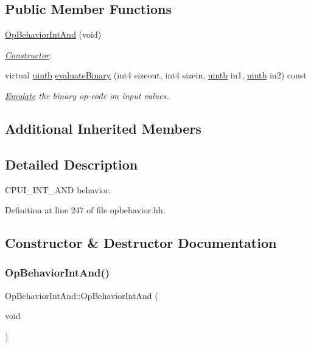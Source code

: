 \subsection*{Public Member Functions}
\begin{DoxyCompactItemize}
\item 
\mbox{\hyperlink{class_op_behavior_int_and_aa3c7566a1b2d06d7e1aba32a1c5fa094}{Op\+Behavior\+Int\+And}} (void)
\begin{DoxyCompactList}\small\item\em \mbox{\hyperlink{class_constructor}{Constructor}}. \end{DoxyCompactList}\item 
virtual \mbox{\hyperlink{types_8h_a2db313c5d32a12b01d26ac9b3bca178f}{uintb}} \mbox{\hyperlink{class_op_behavior_int_and_af41eb8b0c35f3d683e2692e532c116ff}{evaluate\+Binary}} (int4 sizeout, int4 sizein, \mbox{\hyperlink{types_8h_a2db313c5d32a12b01d26ac9b3bca178f}{uintb}} in1, \mbox{\hyperlink{types_8h_a2db313c5d32a12b01d26ac9b3bca178f}{uintb}} in2) const
\begin{DoxyCompactList}\small\item\em \mbox{\hyperlink{class_emulate}{Emulate}} the binary op-\/code on input values. \end{DoxyCompactList}\end{DoxyCompactItemize}
\subsection*{Additional Inherited Members}


\subsection{Detailed Description}
C\+P\+U\+I\+\_\+\+I\+N\+T\+\_\+\+A\+ND behavior. 

Definition at line 247 of file opbehavior.\+hh.



\subsection{Constructor \& Destructor Documentation}
\mbox{\label{class_op_behavior_int_and_aa3c7566a1b2d06d7e1aba32a1c5fa094}} 
\subsubsection{\texorpdfstring{OpBehaviorIntAnd()}{OpBehaviorIntAnd()}}
{\footnotesize\ttfamily Op\+Behavior\+Int\+And\+::\+Op\+Behavior\+Int\+And (\begin{DoxyParamCaption}\item[{void}]{ }\end{DoxyParamCaption})\hspace{0.3cm}{\ttfamily [inline]}}



